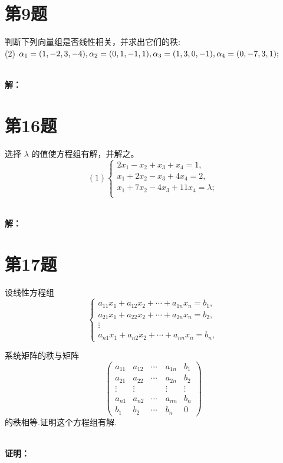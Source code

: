 \documentclass[a4paper, 12pt]{ctexart}
\begin{document}
\section{第9题}
\begin{exercise}
判断下列向量组是否线性相关，并求出它们的秩:\\
(2) $\alpha_1 = (1, -2, 3, -4), \alpha_2 = (0, 1, -1, 1), \\
\alpha_3 = (1, 3, 0, -1), \alpha_4 = (0, -7, 3, 1);$

\end{exercise}~\\
\noindent\textbf{解：}\\


\section{第16题}
\begin{exercise}
选择 $\lambda$ 的值使方程组有解，并解之。
\[
(1)\begin{cases}
2x_1 - x_2 + x_3 + x_4 = 1, \\
x_1 + 2x_2 - x_3 + 4x_4 = 2, \\
x_1 + 7x_2 - 4x_3 + 11x_4 = \lambda; \\
\end{cases}
\]

\end{exercise}~\\
\noindent\textbf{解：}

\section{第17题}
\begin{exercise}
设线性方程组
\[
\begin{cases}
a_{11}x_1 + a_{12}x_2 + \cdots + a_{1n}x_n = b_1, \\
a_{21}x_1 + a_{22}x_2 + \cdots + a_{2n}x_n = b_2, \\
\vdots \\
a_{n1}x_1 + a_{n2}x_2 + \cdots + a_{nn}x_n = b_n,
\end{cases}
\]

系统矩阵的秩与矩阵
\[
\begin{pmatrix}
a_{11} & a_{12} & \cdots & a_{1n} & b_1 \\
a_{21} & a_{22} & \cdots & a_{2n} & b_2 \\
\vdots & \vdots & \quad & \vdots & \vdots \\
a_{n1} & a_{n2} & \cdots & a_{nn} & b_n \\
b_1 & b_2 & \cdots & b_n & 0
\end{pmatrix}
\]
的秩相等.证明这个方程组有解.
\end{exercise}~\\
\noindent\textbf{证明：}
\end{document}
